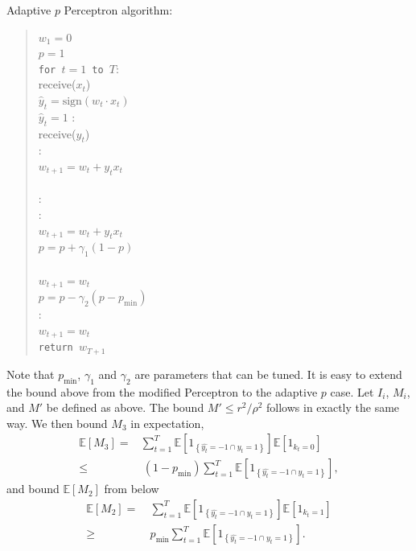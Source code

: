 \documentclass[12pt]{article}
\newcommand{\E}[0]{\mathbb{E}}
\begin{document}
\noindent Adaptive $p$ Perceptron algorithm:
\begin{quotation}
\noindent $w_1=0$\\
\noindent $p=1$\\
{\tt for $t=1$ to $T$}:\\
\indent receive($x_t$)\\
\indent $\widehat{y}_t=\mbox{sign}(w_t\cdot x_t)$\\
 $\widehat{y}_t =1$ : \\
\indent\indent receive($y_t$)\\
\indent{}:\\
\indent\indent\indent $w_{t+1} = w_t + y_t x_t$\\
\indent{}\\
:\\
\indent{}:\\
\indent\indent\indent $w_{t+1} = w_t + y_t x_t$\\
\indent\indent\indent $p=p + \gamma_1(1 - p)$\\
\indent{}\\
\indent\indent\indent $w_{t+1} = w_t$\\
\indent\indent\indent $p = p - \gamma_2(p - p_{\min})$\\
:\\
\indent\indent $w_{t+1} = w_t$\\
{\tt return $w_{T+1}$}
\end{quotation}
Note that $p_{\min}$, $\gamma_1$ and $\gamma_2$ are parameters that can be tuned. It is easy to extend the bound above from the modified Perceptron to the adaptive $p$ case.  Let $I_i$, $M_i$, and $M'$ be defined as above. The bound $M'\leq r^2/\rho^2$ follows in exactly the same way.  We then bound $M_3$ in expectation, 
\begin{align*}
\E[M_3] = & \sum_{t=1}^T \E[1_{\left\{\widehat{y_t} = -1 \cap y_t = 1\right\}}]\E[1_{k_t = 0}] \\
 \leq &\ (1 - p_{\min})\sum_{t=1}^T \E[1_{\left\{\widehat{y_t} = -1 \cap y_t = 1\right\}}],
\end{align*}
and bound $\E[M_2]$ from below
\begin{align*}
\E[M_2] =&\ \sum_{t=1}^T \E[1_{\left\{\hat{y_t} = -1 \cap y_t = 1\right\}}]\E[1_{k_t = 1}] \\
\geq &\ p_{\min}\sum_{t=1}^T \E[1_{\left\{\hat{y_t} = -1 \cap y_t = 1\right\}}].
\end{align*}
\end{document}
